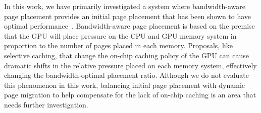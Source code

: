 In this work, we have primarily investigated a system where bandwidth-aware page placement
provides an initial page placement that has been shown to have optimal performance~\cite{Agarwal2015}.
Bandwidth-aware page placement is based on the premise that the GPU will place pressure on
the CPU and GPU memory system in proportion to the number of pages placed in each memory.  Proposals,
like selective caching, that change the on-chip caching policy of the GPU can cause dramatic
shifts in the relative pressure placed on each memory system, effectively changing the bandwidth-optimal 
placement ratio.  Although we do not evaluate this phenomenon in this work, balancing
initial page placement with dynamic page migration to help compensate for the lack of on-chip
caching is an area that needs further investigation.
%
%
%
%
